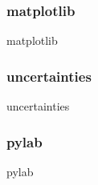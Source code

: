     \subsubsection{matplotlib}
      \begin{frame}{matplotlib}
      \end{frame}

    \subsubsection{uncertainties}
      \begin{frame}{uncertainties}
      \end{frame}

    \subsubsection{pylab}
      \begin{frame}{pylab}
      \end{frame}
